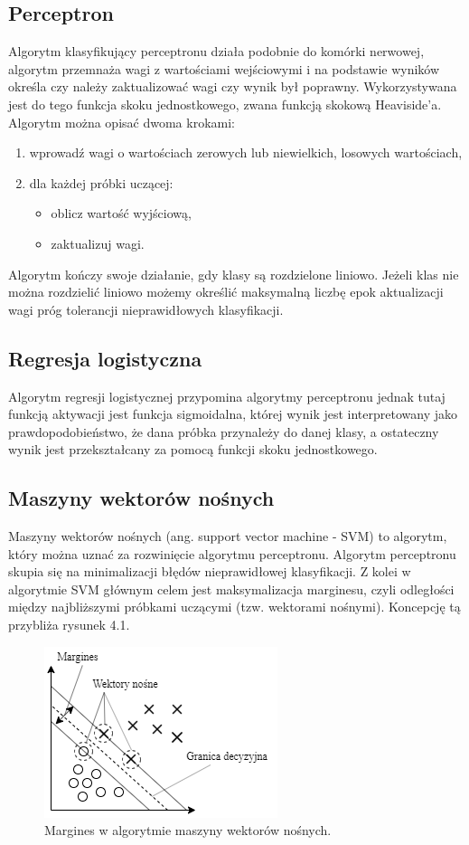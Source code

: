 \documentclass[printmode, eng]{mgr}
\newcommand\tab[1][1cm]{\hspace*{#1}}
\begin{document}
\subsection{Perceptron}
\tab Algorytm klasyfikujący perceptronu działa podobnie do komórki nerwowej, algorytm przemnaża wagi z wartościami wejściowymi i na podstawie wyników określa czy należy zaktualizować wagi czy wynik był poprawny. Wykorzystywana jest do tego funkcja skoku jednostkowego, zwana funkcją skokową Heaviside'a. Algorytm można opisać dwoma krokami:
\begin{enumerate}
\item wprowadź wagi o wartościach zerowych lub niewielkich, losowych wartościach,
\item dla każdej próbki uczącej:
\begin{itemize}
\item oblicz wartość wyjściową,
\item zaktualizuj wagi.
\end{itemize}
\end{enumerate}

\tab Algorytm kończy swoje działanie, gdy klasy są rozdzielone liniowo. Jeżeli klas nie można rozdzielić liniowo możemy określić maksymalną liczbę epok aktualizacji wag\linebreak i próg tolerancji nieprawidłowych klasyfikacji. 

\subsection{Regresja logistyczna}
\tab Algorytm regresji logistycznej przypomina algorytmy perceptronu jednak tutaj funkcją aktywacji jest funkcja sigmoidalna, której wynik jest interpretowany jako prawdopodobieństwo, że dana próbka przynależy do danej klasy, a ostateczny wynik jest przekształcany za pomocą funkcji skoku jednostkowego.

\subsection{Maszyny wektorów nośnych}
\tab Maszyny wektorów nośnych (ang. support vector machine - SVM) to algorytm, który można uznać za rozwinięcie algorytmu perceptronu. Algorytm perceptronu skupia się na minimalizacji błędów nieprawidłowej klasyfikacji. Z kolei w algorytmie SVM głównym celem jest maksymalizacja marginesu, czyli odległości między najbliższymi próbkami uczącymi (tzw. wektorami nośnymi). Koncepcję tą przybliża rysunek 4.1. 
\begin{figure}[H]
\centering
\includegraphics{svm}
\caption{Margines w algorytmie maszyny wektorów nośnych.}
\end{figure}
\end{document}
